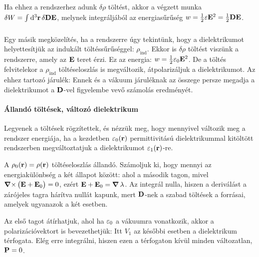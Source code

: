     Ha ehhez a rendszerhez adunk $\delta\rho$ töltést, akkor a végzett munka $\delta W=\int\limits_{}^{}\mathrm{d}^3\mathbf{r}\,\delta\mathbf{D}\mathbf{E}$, melynek integráljából az energiasűrűség $w=\frac{1}{2}\varepsilon\mathbf{E}^2=\frac 12\mathbf{D}\mathbf{E}$.
    
    Egy másik megközelítés, ha a rendszerre úgy tekintünk, hogy a dielektrikumot helyettesítjük az indukált töltéssűrűséggel: $\rho_\text{ind}$. Ekkor is $\delta\rho$ töltést viszünk a rendszerre, amely az $\mathbf{E}$ teret érzi. Ez az energia: $w=\frac{1}{2}\varepsilon_0\mathbf{E}^2$. De a töltés felvitelekor a $\rho_\text{ind}$ töltéseloszlás is megváltozik, átpolarizáljuk a dielektrikumot. Az ehhez tartozó járulék: 
    Ennek és a vákuum járuléknak az összege persze megadja a dielektrikumot a $\mathbf{D}$-vel figyelembe vevő számolás eredményét.
    
   \paragraph{Állandó töltések, változó dielektrikum}
    
    Legyenek a töltések rögzítettek, és nézzük meg, hogy mennyivel változik meg a rendszer energiája, ha a kezdetben $\varepsilon_0(\mathbf{r})$ permittivitású dielektrikummal kitöltött rendszerben megváltoztatjuk a dielektrikumot $\varepsilon_1(\mathbf{r})$-re. 
    
    A $\rho_0(\mathbf{r})=\rho(\mathbf{r})$ töltéseloszlás állandó. Számoljuk ki, hogy mennyi az energiakülönbség a két állapot között:
    ahol a második tagon, mivel $\mathop{\boldsymbol{\nabla}\times}\nolimits{\big(\mathbf{E}+\mathbf{E}_0\big)}=0$, ezért $\mathbf{E}+\mathbf{E}_0=\mathop{\boldsymbol{\nabla}}\nolimits{\lambda}$. Az integrál nulla, hiszen a deriválást a zárójeles tagra hárítva nullát kapunk, mert $\mathbf{D}$-nek a szabad töltések a forrásai, amelyek ugyanazok a két esetben. 
    
    Az első tagot átírhatjuk, ahol ha $\varepsilon_0$ a vákuumra vonatkozik, akkor a polarizációvektort is bevezethetjük:
    Itt $V_1$ az későbbi esetben a dielektrikum térfogata. Elég erre integrálni, hiszen ezen a térfogaton kívül minden változatlan, $\mathbf{P}=0$. 
    
